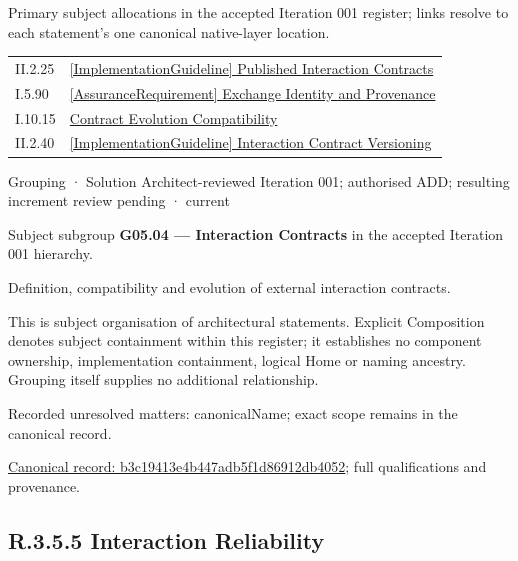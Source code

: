 Primary subject allocations in the accepted Iteration 001 register; links resolve to each statement’s one canonical native-layer location.\par
\begin{longtable}{p{.22\linewidth}p{.73\linewidth}}
II.2.25 & \hyperref[element:b21633d8a1554688baf8704264c63608]{[ImplementationGuideline] Published Interaction Contracts} \\
I.5.90 & \hyperref[element:5579b7ce9df540359b7ba36f807b52c5]{[AssuranceRequirement] Exchange Identity and Provenance} \\
I.10.15 & \hyperref[element:0da415a142c640d9ab1c73d770df8ea3]{Contract Evolution Compatibility} \\
II.2.40 & \hyperref[element:71d7a55f3d8c4b12836601da142cb304]{[ImplementationGuideline] Interaction Contract Versioning} \\
\end{longtable}
\label{element:b3c19413e4b447adb5f1d86912db4052}
{\small Grouping · Solution Architect-reviewed Iteration 001; authorised ADD; resulting increment review pending · current}\par

Subject subgroup \textbf{G05.04 — Interaction Contracts} in the accepted Iteration 001 hierarchy.



Definition, compatibility and evolution of external interaction contracts.



This is subject organisation of architectural statements. Explicit Composition denotes subject containment within this register; it establishes no component ownership, implementation containment, logical Home or naming ancestry. Grouping itself supplies no additional relationship.


{\small Recorded unresolved matters: canonicalName; exact scope remains in the canonical record.}\par
{\footnotesize \href{../../../../continuum/grouping/b3c19413e4b447adb5f1d86912db4052.md}{Canonical record: b3c19413e4b447adb5f1d86912db4052}; full qualifications and provenance.}\par
\subsection*{R.3.5.5 Interaction Reliability}
\label{navigation:R.3.5.5}

